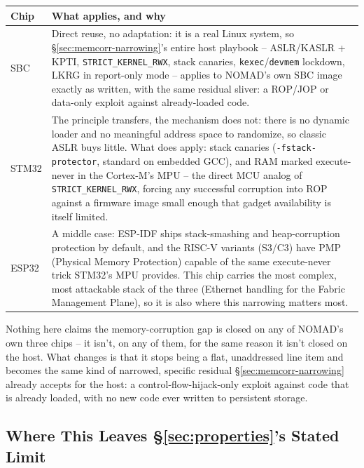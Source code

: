 \documentclass[11pt,a4paper]{article}
\begin{document}
\begin{center}
\renewcommand{\arraystretch}{1.5}
\small
\begin{tabular}{@{}p{2.6cm}p{11.0cm}@{}}
\toprule
\textbf{Chip} & \textbf{What applies, and why} \\
\midrule
SBC & Direct reuse, no adaptation: it is a real Linux system, so
\S\ref{sec:memcorr-narrowing}'s entire host playbook -- ASLR/KASLR +
KPTI, \texttt{STRICT\_KERNEL\_RWX}, stack canaries,
\texttt{kexec}/\texttt{devmem} lockdown, LKRG in report-only mode --
applies to NOMAD's own SBC image exactly as written, with the same
residual sliver: a ROP/JOP or data-only exploit against already-loaded
code. \\
STM32 & The principle transfers, the mechanism does not: there is no
dynamic loader and no meaningful address space to randomize, so
classic ASLR buys little. What does apply: stack canaries
(\texttt{-fstack-protector}, standard on embedded GCC), and RAM marked
execute-never in the Cortex-M's MPU -- the direct MCU analog of
\texttt{STRICT\_KERNEL\_RWX}, forcing any successful corruption into
ROP against a firmware image small enough that gadget availability is
itself limited. \\
ESP32 & A middle case: ESP-IDF ships stack-smashing and
heap-corruption protection by default, and the RISC-V variants (S3/C3)
have PMP (Physical Memory Protection) capable of the same
execute-never trick STM32's MPU provides. This chip carries the most
complex, most attackable stack of the three (Ethernet handling for the
Fabric Management Plane), so it is also where this narrowing matters
most. \\
\bottomrule
\end{tabular}
\end{center}

\begin{plainbox}
Nothing here claims the memory-corruption gap is closed on any of
NOMAD's own three chips -- it isn't, on any of them, for the same
reason it isn't closed on the host. What changes is that it stops
being a flat, unaddressed line item and becomes the same kind of
narrowed, specific residual \S\ref{sec:memcorr-narrowing} already
accepts for the host: a control-flow-hijack-only exploit against code
that is already loaded, with no new code ever written to persistent
storage.
\end{plainbox}

\subsection{Where This Leaves \S\ref{sec:properties}'s Stated Limit}
\end{document}
